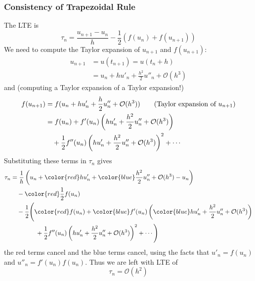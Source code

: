 \documentclass[12pt]{article}
\theoremstyle{definition}
\theoremstyle{definition}
\begin{document}
\subsubsection{Consistency of Trapezoidal Rule}
The LTE is
\begin{equation}
	\tau_n = \frac{u_{n+1}-u_n}{h} - \frac{1}{2}\left(f(u_n) + f(u_{n+1})\right)
\end{equation}
We need to compute the Taylor expansion of $u_{n+1}$ and $f(u_{n+1})$:
\begin{align*}
	u_{n+1} &= u(t_{n+1}) = u(t_n + h) \\
	&=  u_n + hu'_n + \frac{h^2}{2}u''_n + \mathcal{O}(h^3)
\end{align*}
and (computing a Taylor expansion of a Taylor expansion!)
\begin{align*}
	f(u_{n+1}) &= f(u_n + hu'_n + \frac{h}{2}u''_n + \mathcal{O}(h^3)) \tag{Taylor expansion of $u_{n+1}$} \\
	&= f(u_n) + f'(u_n)\left(hu'_n + \frac{h^2}{2}u''_n + \mathcal{O}(h^3)\right) \\
	& \quad + \frac{1}{2}f''(u_n)\left(hu'_n + \frac{h^2}{2}u''_n + \mathcal{O}(h^3)\right)^2 + \cdots 
\end{align*}
Substituting these terms in $\tau_n$ gives
\begin{align*}
	\tau_n &= \frac{1}{h}\left(u_n + {\color{red}hu'_n} + {\color{blue}\frac{h^2}{2}u''_n} + \mathcal{O}(h^3) - u_n\right) \\
	&\quad - {\color{red}\frac{1}{2}f(u_n)} \\
	&\quad - \frac{1}{2}\Bigg({\color{red}f(u_n)} + {\color{blue}f'(u_n)}\left({\color{blue}hu'_n} + \frac{h^2}{2}u''_n + \mathcal{O}(h^3)\right) \\
	&\quad\quad\quad\quad + \frac{1}{2}f''(u_n)\left(hu'_n + \frac{h^2}{2}u''_n + \mathcal{O}(h^3)\right)^2 + \cdots \Bigg)
\end{align*}
the red terms cancel and the blue terms cancel, using the facts that $u'_n = f(u_n)$ and $u''_n = f'(u_n)f(u_n)$. Thus we are left with LTE of
\begin{equation}
	\tau_n = \mathcal{O}(h^2)
\end{equation}
\end{document}
